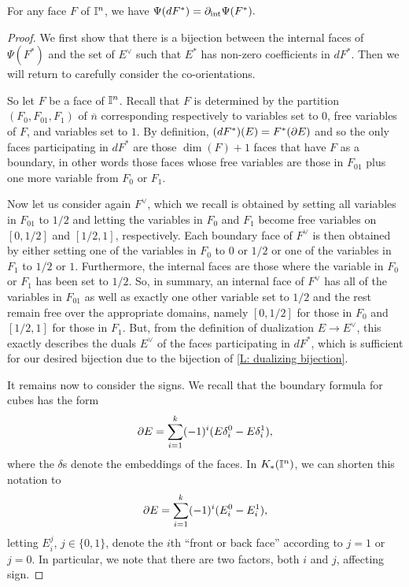 \begin{lemma}\label{L: dualizing bijection}
	For any face $F$ of $\mathbb{I}^n$, we have $\Psi(d F^*) = \partial_{\text{int}}\Psi(F^*).$
\end{lemma}

\begin{proof}
	We first show that there is a bijection between the internal faces of $\Psi(F^*)$ and the set of $E^\vee$ such that $E^*$ has non-zero coefficients in $dF^*$.
	Then we will return to carefully consider the co-orientations.

	So let $F$ be a face of $\mathbb{I}^n$.
	Recall that $F$ is determined by the partition $(F_0,F_{01}, F_1)$ of $\overline{n}$ corresponding respectively to variables set to $0$, free variables of $F$, and variables set to $1$.
	By definition, $(dF^*)(E) = F^*(\partial E)$ and so the only faces participating in $dF^*$ are those $\dim(F)+1$ faces that have $F$ as a boundary, in other words those faces whose free variables are those in $F_{01}$ plus one more variable from $F_0$ or $F_1$.

	Now let us consider again $F^\vee$, which we recall is obtained by setting all variables in $F_{01}$ to $1/2$ and letting the variables in $F_0$ and $F_1$ become free variables on $[0,1/2]$ and $[1/2,1]$, respectively.
	Each boundary face of $F^\vee$ is then obtained by either setting one of the variables in $F_0$ to $0$ or $1/2$ or one of the variables in $F_1$ to $1/2$ or $1$.
	Furthermore, the internal faces are those where the variable in $F_0$ or $F_1$ has been set to $1/2$.
	So, in summary, an internal face of $F^\vee$ has all of the variables in $F_{01}$ as well as exactly one other variable set to $1/2$ and the rest remain free over the appropriate domains, namely $[0,1/2]$ for those in $F_0$ and $[1/2,1]$ for those in $F_1$.
	But, from the definition of dualization $E \to E^\vee$, this exactly describes the duals $E^\vee$ of the faces participating in $dF^*$, which is sufficient for our desired bijection due to the bijection of \cref{L: dualizing bijection}.

	It remains now to consider the signs.
	We recall that the boundary formula for cubes has the form
	$$\partial E = \sum_{i = 1}^k (-1)^i(E \delta_i^0-E \delta^1_i),$$ where the $\delta$s denote the embeddings of the faces.
	In $K_*(\mathbb{I}^n)$, we can shorten this notation to $$\partial E = \sum_{i = 1}^k (-1)^i(E_i^0-E^1_i),$$ letting $E_i^j$, $j \in \{0,1\}$, denote the $i$th ``front or back face'' according to $j = 1$ or $j = 0$.
	In particular, we note that there are two factors, both $i$ and $j$, affecting sign.


\end{proof}
